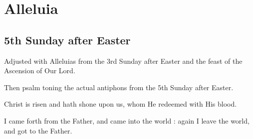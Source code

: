 \documentclass[12pt,a4paper]{article}
\begin{document}
\autocompilegabc

\section{Alleluia}

\subsection{5th Sunday after Easter}

Adjusted with Alleluias from the 3rd Sunday after Easter and the feast of the Ascension of Our Lord.

Then psalm toning the actual antiphons from the 5th Sunday after Easter.

\bigskip


\bigskip

Christ is risen and hath shone upon us, whom He redeemed with His blood.

\bigskip


\bigskip

I came forth from the Father, and came into the world : again I leave the world, and got to the Father.
\end{document}
